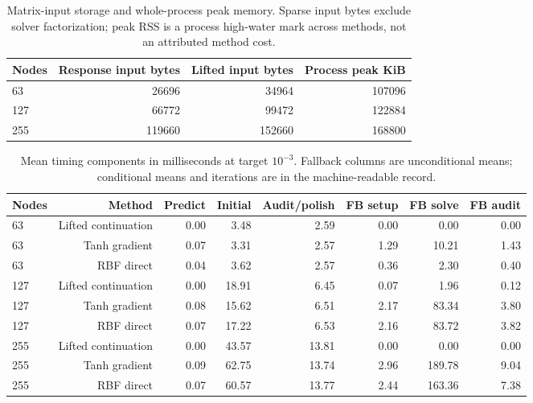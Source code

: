 \documentclass[11pt,letterpaper]{article}
\theoremstyle{definition}
\newcommand{\1}{\mathbf 1}
\begin{document}
\begin{table}[tbp]\centering\scriptsize
\caption{Matrix-input storage and whole-process peak memory. Sparse input bytes exclude solver factorization; peak RSS is a process high-water mark across methods, not an attributed method cost.}
\label{tab:r24-memory}
\begin{tabular}{lrrr}
\toprule
Nodes & Response input bytes & Lifted input bytes & Process peak KiB\\
\midrule
63 & 26696 & 34964 & 107096\\
127 & 66772 & 99472 & 122884\\
255 & 119660 & 152660 & 168800\\
\bottomrule
\end{tabular}
\end{table}

\begin{table}[tbp]\centering\scriptsize
\caption{Mean timing components in milliseconds at target $10^{-3}$. Fallback columns are unconditional means; conditional means and iterations are in the machine-readable record.}
\label{tab:r24-components-0.001}
\begin{tabular}{lrrrrrrr}
\toprule
Nodes & Method & Predict & Initial & Audit/polish & FB setup & FB solve & FB audit\\
\midrule
63 & Lifted continuation & 0.00 & 3.48 & 2.59 & 0.00 & 0.00 & 0.00\\
63 & Tanh gradient & 0.07 & 3.31 & 2.57 & 1.29 & 10.21 & 1.43\\
63 & RBF direct & 0.04 & 3.62 & 2.57 & 0.36 & 2.30 & 0.40\\
127 & Lifted continuation & 0.00 & 18.91 & 6.45 & 0.07 & 1.96 & 0.12\\
127 & Tanh gradient & 0.08 & 15.62 & 6.51 & 2.17 & 83.34 & 3.80\\
127 & RBF direct & 0.07 & 17.22 & 6.53 & 2.16 & 83.72 & 3.82\\
255 & Lifted continuation & 0.00 & 43.57 & 13.81 & 0.00 & 0.00 & 0.00\\
255 & Tanh gradient & 0.09 & 62.75 & 13.74 & 2.96 & 189.78 & 9.04\\
255 & RBF direct & 0.07 & 60.57 & 13.77 & 2.44 & 163.36 & 7.38\\
\bottomrule
\end{tabular}
\end{table}
\end{document}
